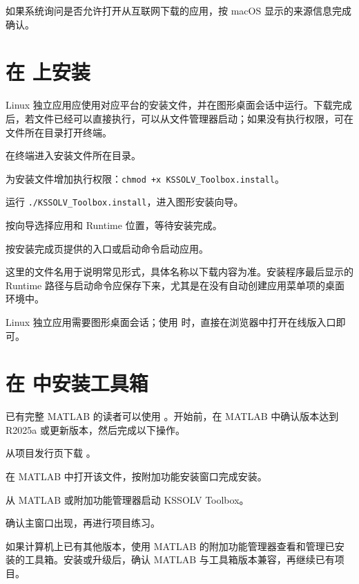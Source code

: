 如果系统询问是否允许打开从互联网下载的应用，按 macOS 显示的来源信息完成确认。

\section{在  上安装}

Linux 独立应用应使用对应平台的安装文件，并在图形桌面会话中运行。下载完成后，若文件已经可以直接执行，可以从文件管理器启动；如果没有执行权限，可在文件所在目录打开终端。

\begin{steps}
\item 在终端进入安装文件所在目录。
\item 为安装文件增加执行权限：\texttt{chmod +x KSSOLV\_Toolbox.install}。
\item 运行 \texttt{./KSSOLV\_Toolbox.install}，进入图形安装向导。
\item 按向导选择应用和 Runtime 位置，等待安装完成。
\item 按安装完成页提供的入口或启动命令启动应用。
\end{steps}

这里的文件名用于说明常见形式，具体名称以下载内容为准。安装程序最后显示的 Runtime 路径与启动命令应保存下来，尤其是在没有自动创建应用菜单项的桌面环境中。

Linux 独立应用需要图形桌面会话；使用 \ksonline{} 时，直接在浏览器中打开在线版入口即可。


\section{在 \regmark{} 中安装工具箱}

已有完整 MATLAB\regmark{} 的读者可以使用 。开始前，在 MATLAB\regmark{} 中确认版本达到 R2025a 或更新版本，然后完成以下操作。

\begin{steps}
\item 从项目发行页下载 。
\item 在 MATLAB\regmark{} 中打开该文件，按附加功能安装窗口完成安装。
\item 从 MATLAB\regmark{} 或附加功能管理器启动 KSSOLV Toolbox。
\item 确认主窗口出现，再进行项目练习。
\end{steps}

如果计算机上已有其他版本，使用 MATLAB\regmark{} 的附加功能管理器查看和管理已安装的工具箱。安装或升级后，确认 MATLAB\regmark{} 与工具箱版本兼容，再继续已有项目。

